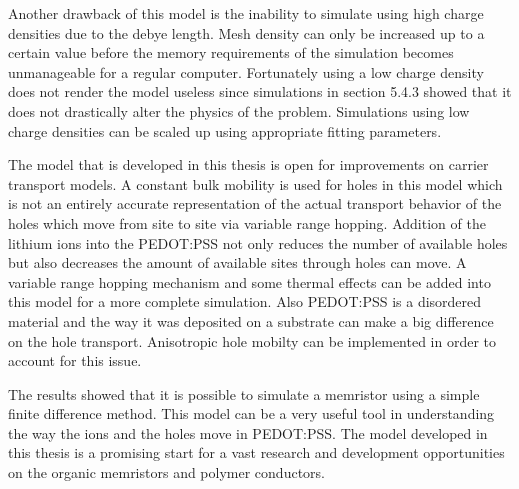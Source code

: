 \begin{doublespace}
Another drawback of this model is the inability to simulate using high charge densities due to the debye length. Mesh density can only be increased up to a certain value before the memory requirements of the simulation becomes unmanageable for a regular computer. Fortunately using a low charge density does not render the model useless since simulations in section 5.4.3 showed that it does not drastically alter the physics of the problem. Simulations using low charge densities can be scaled up using appropriate fitting parameters.  
 
The model that is developed in this thesis is open for improvements on carrier transport models. A constant bulk mobility is used for holes in this model which is not an entirely accurate representation of the actual transport behavior of the holes which move from site to site via variable range hopping. Addition of the lithium ions into the PEDOT:PSS not only reduces the number of available holes but also decreases the amount of available sites through holes can move. A variable range hopping mechanism and some thermal effects can be added into this model for a more complete simulation. Also PEDOT:PSS is a disordered material and the way it was deposited on a substrate can make a big difference on the hole transport. Anisotropic hole mobilty can be implemented in order to account for this issue.

The results showed that it is possible to simulate a memristor using a simple finite difference method. This model can be a very useful tool in understanding the way the ions and the holes move in PEDOT:PSS. The model developed in this thesis is a promising start for a vast research and development opportunities on the organic memristors and polymer conductors.

\end{doublespace}

